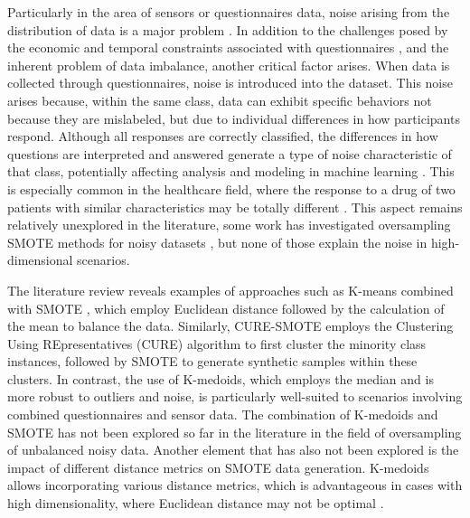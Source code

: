 \documentclass[12pt]{book}
\begin{document}
Particularly in the area of sensors or questionnaires data, noise arising from the distribution of data is a major problem \citep{mansouri2023iot,gao2021forecast}. In addition to the challenges posed by the economic and temporal constraints associated with questionnaires \citep{kitsios2022user}, and the inherent problem of data imbalance, another critical factor arises. When data is collected through questionnaires, noise is introduced into the dataset. This noise arises because, within the same class, data can exhibit specific behaviors not because they are mislabeled, but due to individual differences in how participants respond. %
Although all responses are correctly classified, the differences in how questions are interpreted and answered generate a type of noise characteristic of that class, potentially affecting analysis and modeling in machine learning \citep{grimm2010social}. This is especially common in the healthcare field, where the response to a drug of two patients with similar characteristics may be totally different \citep{wang2021machine}. This aspect remains relatively unexplored in the literature, some work has investigated oversampling SMOTE methods for noisy datasets \citep{maulidevi2022smote,kosolwattana2023self}, but none of those explain the noise in high-dimensional scenarios.



The literature review reveals examples of approaches such as K-means combined with SMOTE \citep{liang2020lr,zhu2023automatic}, which employ Euclidean distance followed by the calculation of the mean to balance the data. Similarly, CURE-SMOTE \citep{ma2017cure} employs the Clustering Using REpresentatives (CURE) algorithm to first cluster the minority class instances, followed by SMOTE to generate synthetic samples within these clusters. In contrast, the use of K-medoids, which employs the median and is more robust to outliers and noise, is particularly well-suited to scenarios involving combined questionnaires and sensor data. The combination of K-medoids and SMOTE has not been explored so far in the literature in the field of oversampling of unbalanced noisy data. Another element that has also not been explored is the impact of different distance metrics on SMOTE data generation. K-medoids allows incorporating various distance metrics, which is advantageous in cases with high dimensionality, where Euclidean distance may not be optimal \citep{aggarwal2001surprising}.
\end{document}
